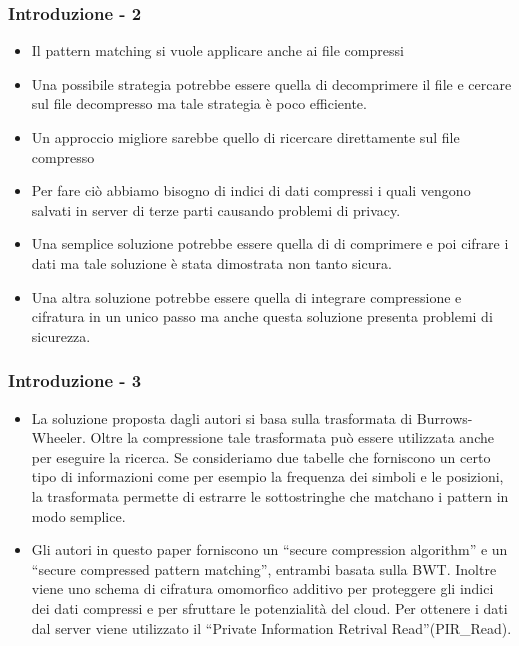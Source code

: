\documentclass{beamer}
\begin{document}
\begin{frame}
\frametitle{Introduzione - 2}
	\begin{itemize}
		\item Il pattern matching si vuole applicare anche ai file compressi
		\pause
		\item Una possibile strategia potrebbe essere quella di decomprimere il file e cercare sul file decompresso ma tale strategia è poco efficiente.
		\pause
		\item Un approccio migliore sarebbe quello di ricercare direttamente sul file compresso 
		\item Per fare ciò abbiamo bisogno di indici di dati compressi i quali vengono salvati in server di terze parti causando problemi di privacy. 
		\pause
		\item Una semplice soluzione potrebbe essere quella di di comprimere e poi cifrare i dati ma tale soluzione è stata dimostrata non tanto sicura.
		\pause
		\item Una altra soluzione potrebbe essere quella di integrare compressione e cifratura in un unico passo ma anche questa soluzione presenta problemi di sicurezza.
		
	\end{itemize}
\end{frame}

\begin{frame}
\frametitle{Introduzione - 3}
	\begin{itemize}
		\item La soluzione proposta dagli autori si basa sulla trasformata di Burrows-Wheeler. Oltre la compressione tale trasformata può essere utilizzata anche per eseguire la ricerca. Se consideriamo due tabelle che forniscono un certo tipo di informazioni come per esempio la frequenza dei simboli e le posizioni, la trasformata permette di estrarre le sottostringhe che matchano i pattern in modo semplice.
		\pause
		\item Gli autori in questo paper forniscono un ``secure compression algorithm'' e un “secure compressed pattern matching”, entrambi basata sulla BWT. Inoltre viene uno schema di cifratura omomorfico additivo per proteggere gli indici dei dati compressi e per sfruttare le potenzialità del cloud. Per ottenere i dati dal server viene utilizzato il ``Private Information Retrival Read''(PIR\_Read).
		
	\end{itemize}
\end{frame}
\end{document}
